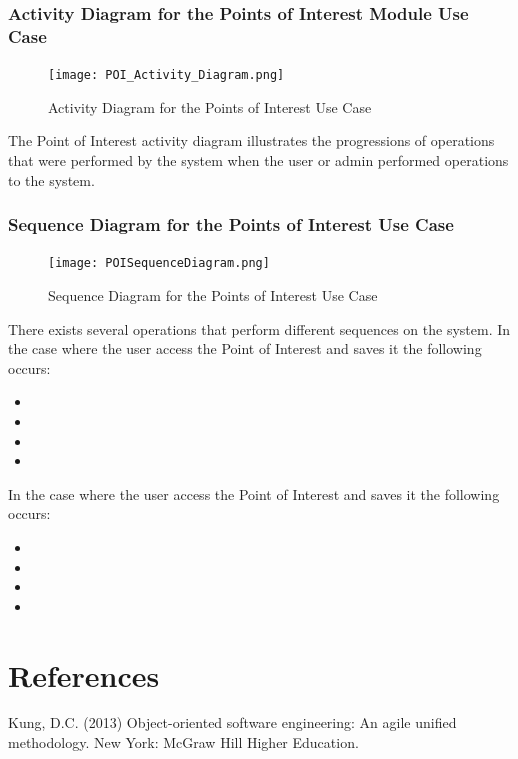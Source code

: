 \documentclass[runningheads,a4paper]{article}
\begin{document}
\subsubsection {Activity Diagram for the Points of Interest Module Use Case}
 	\begin{figure}[H]
   	\centering
   	\texttt{[image: POI\_Activity\_Diagram.png]}
   	\caption{Activity Diagram for the Points of Interest Use Case}
	\end{figure}
	
	The Point of Interest activity diagram illustrates the progressions of operations that were performed by the system when the user or admin performed operations to the system. 
	 
\subsubsection {Sequence Diagram for the Points of Interest Use Case}
 	\begin{figure}[H]
   	\centering
   	\texttt{[image: POISequenceDiagram.png]}
   	\caption{Sequence Diagram for the Points of Interest Use Case}
	\end{figure}
	There exists several operations that perform different sequences on the system.
	In the case where the user access the Point of Interest and saves it the following occurs:
	\begin{itemize}
		\item  
		\item
		\item
		\item
	\end{itemize}
	
	In the case where the user access the Point of Interest and saves it the following occurs:
	\begin{itemize}
		\item  
		\item
		\item
		\item
	\end{itemize}
	


\section{References}

Kung, D.C. (2013) Object-oriented software engineering: An agile unified methodology. New York: McGraw Hill Higher Education.
\end{document}
